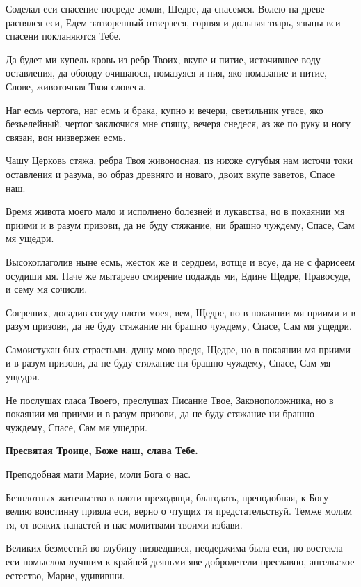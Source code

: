 Соделал еси спасение посреде земли, Щедре, да спасемся. Волею на древе распялся еси, Едем затворенный отверзеся, горняя и дольняя тварь, языцы вси спасени покланяются Тебе.

Да будет ми купель кровь из ребр Твоих, вкупе и питие, источившее воду оставления, да обоюду очищаюся, помазуяся и пия, яко помазание и питие, Слове, животочная Твоя словеса.

Наг есмь чертога, наг есмь и брака, купно и вечери, светильник угасе, яко безъелейный, чертог заключися мне спящу, вечеря снедеся, аз же по руку и ногу связан, вон низвержен есмь.

Чашу Церковь стяжа, ребра Твоя живоносная, из нихже сугубыя нам источи токи оставления и разума, во образ древняго и новаго, двоих вкупе заветов, Спасе наш.

Время живота моего мало и исполнено болезней и лукавства, но в покаянии мя приими и в разум призови, да не буду стяжание, ни брашно чуждему, Спасе, Сам мя ущедри.

Высокоглаголив ныне есмь, жесток же и сердцем, вотще и всуе, да не с фарисеем осудиши мя. Паче же мытарево смирение подаждь ми, Едине Щедре, Правосуде, и сему мя сочисли.

Согреших, досадив сосуду плоти моея, вем, Щедре, но в покаянии мя приими и в разум призови, да не буду стяжание ни брашно чуждему, Спасе, Сам мя ущедри.

Самоистукан бых страстьми, душу мою вредя, Щедре, но в покаянии мя приими и в разум призови, да не буду стяжание ни брашно чуждему, Спасе, Сам мя ущедри.

Не послушах гласа Твоего, преслушах Писание Твое, Законоположника, но в покаянии мя приими и в разум призови, да не буду стяжание ни брашно чуждему, Спасе, Сам мя ущедри.

\bfseries Пресвятая Троице, Боже наш, слава Тебе.

Преподобная мати Марие, моли Бога о нас.\normalfont{}

Безплотных жительство в плоти преходящи, благодать, преподобная, к Богу велию воистинну прияла еси, верно о чтущих тя предстательствуй. Темже молим тя, от всяких напастей и нас молитвами твоими избави.


Великих безместий во глубину низведшися, неодержима была еси, но востекла еси помыслом лучшим к крайней деяньми яве добродетели преславно, ангельское естество, Марие, удививши.

